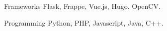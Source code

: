 

\begin{cvskills}

  \cvskill
    {Frameworks} %
    {Flask, Frappe, Vue.js, Hugo, OpenCV.} %
      
  \cvskill
    {Programming} %
    {Python, PHP, Javascript, Java, C++.} %

\end{cvskills}
